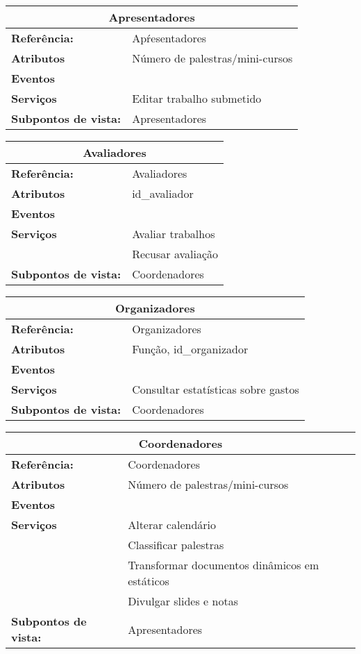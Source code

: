 \documentclass[letter]{article}
\begin{document}
%
\begin{table}


\begin{tabular}{|ll|}
\hline 
\multicolumn{2}{|c|}{\textbf{Apresentadores}}\tabularnewline
\hline
\textbf{Referência:} & Ap\'{r}esentadores\tabularnewline
\textbf{Atributos} & Número de palestras/mini-cursos\tabularnewline
\textbf{Eventos} & \tabularnewline
\textbf{Serviços} & Editar trabalho submetido\tabularnewline
\textbf{Subpontos de vista:} & Apresentadores \tabularnewline
\hline
\end{tabular}
\end{table}


%
\begin{table}


\begin{tabular}{|ll|}
\hline 
\multicolumn{2}{|c|}{\textbf{Avaliadores}}\tabularnewline
\hline
\textbf{Referência:} & Avaliadores\tabularnewline
\textbf{Atributos} & id\_avaliador\tabularnewline
\textbf{Eventos} & \tabularnewline
\textbf{Serviços} & Avaliar trabalhos\tabularnewline
 & Recusar avaliação\tabularnewline
\textbf{Subpontos de vista:} & Coordenadores\tabularnewline
\hline
\end{tabular}
\end{table}
%
\begin{table}
\begin{tabular}{|ll|}
\hline 
\multicolumn{2}{|c|}{\textbf{Organizadores}}\tabularnewline
\hline
\textbf{Referência:} & Organizadores\tabularnewline
\textbf{Atributos} & Função, id\_organizador\tabularnewline
\textbf{Eventos} & \tabularnewline
\textbf{Serviços} & Consultar estatísticas sobre gastos\tabularnewline
\textbf{Subpontos de vista:} & Coordenadores\tabularnewline
\hline
\end{tabular}
\end{table}


%
\begin{table}


\begin{tabular}{|ll|}
\hline 
\multicolumn{2}{|c|}{\textbf{Coordenadores}}\tabularnewline
\hline
\textbf{Referência:} & Coordenadores\tabularnewline
\textbf{Atributos} & Número de palestras/mini-cursos\tabularnewline
\textbf{Eventos} & \tabularnewline
\textbf{Serviços} & Alterar calendário\tabularnewline
 & Classificar palestras\tabularnewline
 & Transformar documentos dinâmicos em estáticos\tabularnewline
 & Divulgar slides e notas\tabularnewline
\textbf{Subpontos de vista:} & Apresentadores \tabularnewline
\hline
\end{tabular}
\end{table}
\end{document}
